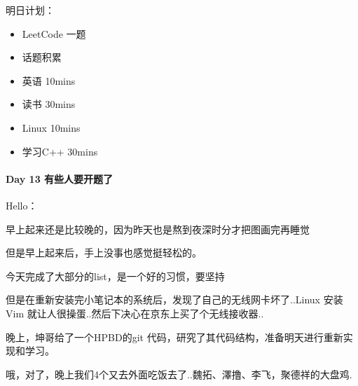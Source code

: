 \documentclass[UTF8,a4paper,8pt]{ctexbook}
\begin{document}
		 	 明日计划：
			 	 \begin{itemize}
			 	 	\item  LeetCode 一题	
			 	 	\item \makebox[0pt][l]{$\square$}\raisebox{.15ex}{\hspace{0.1em}$\checkmark$} 话题积累 	
			 	 	\item \makebox[0pt][l]{$\square$}\raisebox{.15ex}{\hspace{0.1em}$\checkmark$} 英语 10mins 	
			 	 	\item \makebox[0pt][l]{$\square$}\raisebox{.15ex}{\hspace{0.1em}$\checkmark$} 读书 30mins	
			 	 	\item \makebox[0pt][l]{$\square$}\raisebox{.15ex}{\hspace{0.1em}$\checkmark$} Linux 10mins	  
			 	 	\item \makebox[0pt][l]{$\square$}\raisebox{.15ex}{\hspace{0.1em}$\checkmark$} 学习C++ 30mins 
			 	 \end{itemize}
 	 \paragraph{Day 13   有些人要开题了   \quad     }Hello：
 	 
		 	 早上起来还是比较晚的，因为昨天也是熬到夜深时分才把图画完再睡觉
			 	 
			 但是早上起来后，手上没事也感觉挺轻松的。
			 
			 今天完成了大部分的list，是一个好的习惯，要坚持
			 
			 但是在重新安装完小笔记本的系统后，发现了自己的无线网卡坏了..Linux 安装Vim 就让人很操蛋..然后下决心在京东上买了个无线接收器..
			 
			 晚上，坤哥给了一个HPBD的git 代码，研究了其代码结构，准备明天进行重新实现和学习。
			 
			 哦，对了，晚上我们4个又去外面吃饭去了..魏拓、澤撸、李飞，聚德祥的大盘鸡.
			 
\end{document}
